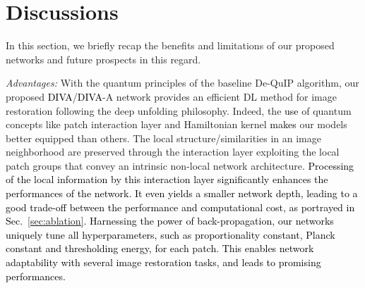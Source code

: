 \documentclass[10pt,journal,compsoc]{IEEEtran}
\newcommand{\sd}{\textcolor{black}}
\newcommand{\dk}{\textcolor{black}}
\begin{document}






\section{Discussions}
\label{sec:discuss}

In this section, we briefly recap the benefits and limitations of our proposed networks and future prospects in this regard.


\textit{Advantages:}
With the quantum principles of the baseline De-QuIP algorithm, our proposed \dk{DIVA}/\dk{DIVA}-A network provides an efficient DL method for image restoration following the deep unfolding philosophy. Indeed, the \sd{use} of quantum concepts like patch interaction layer and Hamiltonian kernel \sd{makes} our models better equipped than others. The local structure/similarities in an image neighborhood are preserved through the interaction layer exploiting the local patch groups that convey an intrinsic non-local network architecture. \dk{Processing of the local information by this interaction layer significantly enhances the performances of the network. It even yields  a smaller network depth, leading to a good trade-off between the performance and computational cost, as portrayed in Sec.~\ref{sec:ablation}. Harnessing the power of back-propagation, our networks uniquely tune all hyperparameters, such as proportionality constant, Planck constant and thresholding energy, for each patch. This enables network adaptability with several image restoration tasks, and leads to promising performances.}
\end{document}
